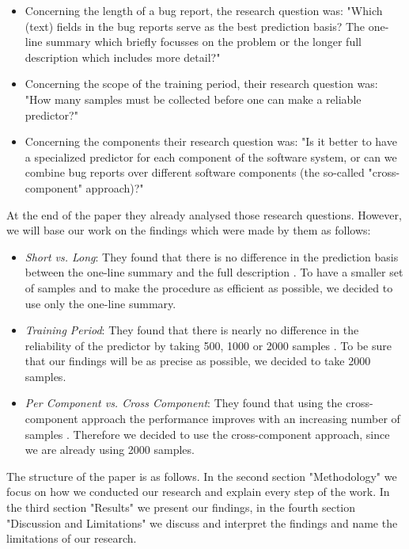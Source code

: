 \documentclass[sigconf,screen]{acmart}
\begin{document}
\begin{itemize}
	\item Concerning the length of a bug report, the research question was: "Which (text) fields in the bug reports serve as the best prediction basis? The one-line summary which briefly focusses on the problem or the longer full description which includes more detail?" \cite{ourPaper}
	
	\item Concerning the scope of the training period, their research question was: "How many samples must be collected before one can make a reliable predictor?" \cite{ourPaper}
	
	\item Concerning the components their research question was: "Is it better to have a specialized predictor for each component of the software system, or can we combine bug reports over different software components (the so-called "cross- component" approach)?" \cite{ourPaper}
\end{itemize}

At the end of the paper they already analysed those research questions. However, we will base our work on the findings which were made by them as follows:

\begin{itemize}
	\item \textit{Short vs. Long}: They found that there is no difference in the prediction basis between the one-line summary and the full description \cite{ourPaper}. To have a smaller set of samples and to make the procedure as efficient as possible, we decided to use only the one-line summary.
	
	\item \textit{Training Period}: They found that there is nearly no difference in the reliability of the predictor by taking 500, 1000 or 2000 samples \cite{ourPaper}. To be sure that our findings will be as precise as possible, we decided to take 2000 samples.
	
	\item \textit{Per Component vs. Cross Component}: They found that using the cross-component approach the performance improves with an increasing number of samples \cite{ourPaper}. Therefore we decided to use the cross-component approach, since we are already using 2000 samples.
\end{itemize}

The structure of the paper is as follows. In the second section "Methodology" we focus on how we conducted our research and explain every step of the work. In the third section "Results" we present our findings, in the fourth section "Discussion and Limitations" we discuss and interpret the findings and name the limitations of our research.
\end{document}
